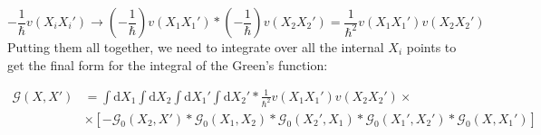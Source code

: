 \begin{equation} \label{eq:61}
- \frac{1}{\hbar} v \left( X_{i} X_{i}' \right)
\to
\left( - \frac{1}{\hbar} \right) v \left( X_{1} X_{1}' \right)
*
\left( - \frac{1}{\hbar} \right) v \left( X_{2} X_{2}' \right)
=
\frac{1}{\hbar^{2}} v \left( X_{1} X_{1}' \right) v \left( X_{2} X_{2}' \right)
\end{equation}
Putting them all together, we need to integrate over all the internal $X_{i}$ points to get the final form for the integral of the Green's function:

\begin{align} \label{eq:62}
\mathcal{G} \left( X, X' \right)
&=
\int \text{d}X_{1} \int \text{d}X_{2} \int \text{d}X_{1}' \int \text{d}X_{2}'
*
\frac{1}{\hbar^{2}} v \left( X_{1} X_{1}' \right) v \left( X_{2} X_{2}' \right)
\times \nonumber \\
&\times
\left[
- \mathcal{G}_{0} \left( X_{2}, X' \right)
*
\mathcal{G}_{0} \left( X_{1}, X_{2} \right)
*
\mathcal{G}_{0} \left( X_{2}', X_{1} \right)
*
\mathcal{G}_{0} \left( X_{1}', X_{2}' \right)
*
\mathcal{G}_{0} \left( X, X_{1}' \right)
\right]
\end{align}